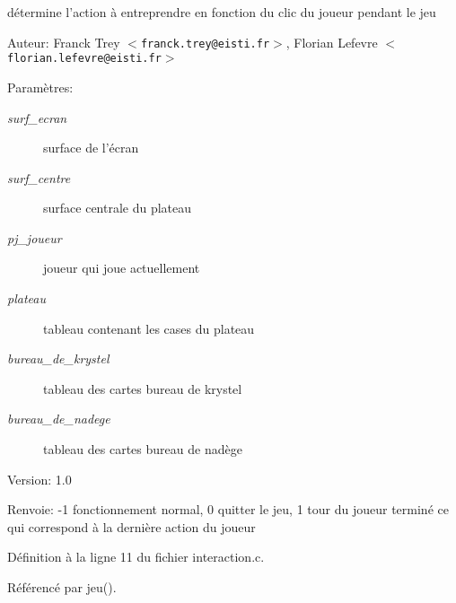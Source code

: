 d\'{e}termine l'action \`{a} entreprendre en fonction du clic du joueur pendant le jeu 

\begin{Desc}
\item[Auteur:]Franck Trey $<${\tt franck.trey@eisti.fr}$>$, Florian Lefevre $<${\tt florian.lefevre@eisti.fr}$>$\end{Desc}
\begin{Desc}
\item[Param\`{e}tres:]
\begin{description}
\item[{\em surf\_\-ecran}]surface de l'\'{e}cran \item[{\em surf\_\-centre}]surface centrale du plateau \item[{\em pj\_\-joueur}]joueur qui joue actuellement \item[{\em plateau}]tableau contenant les cases du plateau \item[{\em bureau\_\-de\_\-krystel}]tableau des cartes bureau de krystel \item[{\em bureau\_\-de\_\-nadege}]tableau des cartes bureau de nad\`{e}ge\end{description}
\end{Desc}
\begin{Desc}
\item[Version:]1.0 \end{Desc}
\begin{Desc}
\item[Renvoie:]-1 fonctionnement normal, 0 quitter le jeu, 1 tour du joueur termin\'{e} ce qui correspond \`{a} la derni\`{e}re action du joueur \end{Desc}


D\'{e}finition \`{a} la ligne 11 du fichier interaction.c.

R\'{e}f\'{e}renc\'{e} par jeu().

